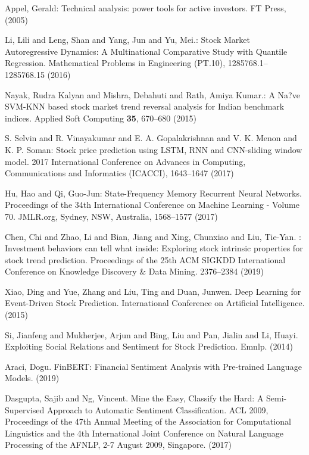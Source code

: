 \documentclass[runningheads]{llncs}
\begin{document}
\begin{thebibliography}{8}
Appel, Gerald: Technical analysis: power tools for active investors. FT Press, (2005)

Li, Lili and Leng, Shan and Yang, Jun and Yu, Mei.: Stock Market Autoregressive Dynamics: A Multinational Comparative Study with Quantile Regression. Mathematical Problems in Engineering (PT.10), 1285768.1--1285768.15 (2016)

Nayak, Rudra Kalyan and Mishra, Debahuti and Rath, Amiya Kumar.: A Na?ve SVM-KNN based stock market trend reversal analysis for Indian benchmark indices. Applied Soft Computing \textbf{35}, 670--680 (2015)

S. {Selvin} and R. {Vinayakumar} and E. A. {Gopalakrishnan} and V. K. {Menon} and K. P. {Soman}: Stock price prediction using LSTM, RNN and CNN-sliding window model. 2017 International Conference on Advances in Computing, Communications and Informatics (ICACCI), 1643--1647 (2017)

Hu, Hao and Qi, Guo-Jun: State-Frequency Memory Recurrent Neural Networks. Proceedings of the 34th International Conference on Machine Learning - Volume 70. JMLR.org, Sydney, NSW, Australia, 1568–1577 (2017)

Chen, Chi and Zhao, Li and Bian, Jiang and Xing, Chunxiao and Liu, Tie-Yan. : Investment behaviors can tell what inside: Exploring stock intrinsic properties for stock trend prediction. Proceedings of the 25th ACM SIGKDD International Conference on Knowledge Discovery \& Data Mining. 2376--2384 (2019)

Xiao, Ding and Yue, Zhang and Liu, Ting and Duan, Junwen. Deep Learning for Event-Driven Stock Prediction. International Conference on Artificial Intelligence. (2015)

Si, Jianfeng and Mukherjee, Arjun and Bing, Liu and Pan, Jialin and Li, Huayi. Exploiting Social Relations and Sentiment for Stock Prediction. Emnlp. (2014)

Araci, Dogu. FinBERT: Financial Sentiment Analysis with Pre-trained Language Models. (2019)

Dasgupta, Sajib and Ng, Vincent. Mine the Easy, Classify the Hard: A Semi-Supervised Approach to Automatic Sentiment Classification. ACL 2009, Proceedings of the 47th Annual Meeting of the Association for Computational Linguistics and the 4th International Joint Conference on Natural Language Processing of the AFNLP, 2-7 August 2009, Singapore. (2017)

\end{thebibliography}
\end{document}
